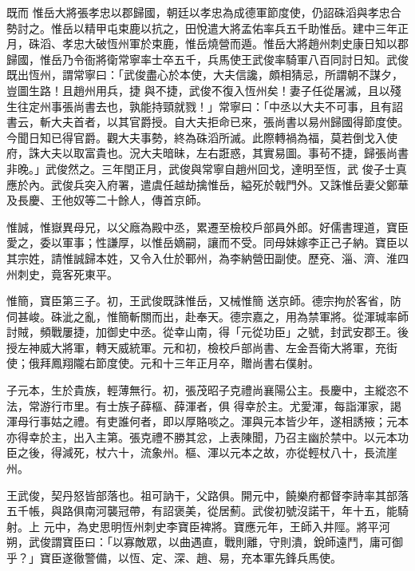 \begin{pinyinscope}
 既而
 惟岳大將張孝忠以郡歸國，朝廷以孝忠為成德軍節度使，仍詔硃滔與孝忠合勢討之。惟岳以精甲屯束鹿以抗之，田悅遣大將孟佑率兵五千助惟岳。建中三年正月，硃滔、孝忠大破恆州軍於束鹿，惟岳燒營而遁。惟岳大將趙州刺史康日知以郡歸國，惟岳乃令衙將衛常寧率士卒五千，兵馬使王武俊率騎軍八百同討日知。武俊既出恆州，謂常寧曰：「武俊盡心於本使，大夫信讒，頗相猜忌，所謂朝不謀夕，豈圖生路！且趙州用兵，捷
 與不捷，武俊不復入恆州矣！妻子任從屠滅，且以殘生往定州事張尚書去也，孰能持頸就戮！」常寧曰：「中丞以大夫不可事，且有詔書云，斬大夫首者，以其官爵授。自大夫拒命已來，張尚書以易州歸國得節度使。今聞日知已得官爵。觀大夫事勢，終為硃滔所滅。此際轉禍為福，莫若倒戈入使府，誅大夫以取富貴也。況大夫暗昧，左右誑惑，其實易圖。事茍不捷，歸張尚書非晚。」武俊然之。三年閏正月，武俊與常寧自趙州回戈，達明至恆，武
 俊子士真應於內。武俊兵突入府署，遣虞任越劫擒惟岳，縊死於戟門外。又誅惟岳妻父鄭華及長慶、王他奴等二十餘人，傳首京師。



 惟誠，惟嶽異母兄，以父廕為殿中丞，累遷至檢校戶部員外郎。好儒書理道，寶臣愛之，委以軍事；性謙厚，以惟岳嫡嗣，讓而不受。同母妹嫁李正己子納。寶臣以其宗姓，請惟誠歸本姓，又令入仕於鄆州，為李納營田副使。歷兗、淄、濟、淮四州刺史，竟客死東平。



 惟簡，寶臣第三子。初，王武俊既誅惟岳，又械惟簡
 送京師。德宗拘於客省，防伺甚峻。硃泚之亂，惟簡斬關而出，赴奉天。德宗嘉之，用為禁軍將。從渾瑊率師討賊，頻戰屢捷，加御史中丞。從幸山南，得「元從功臣」之號，封武安郡王。後授左神威大將軍，轉天威統軍。元和初，檢校戶部尚書、左金吾衛大將軍，充街使；俄拜鳳翔隴右節度使。元和十三年正月卒，贈尚書右僕射。



 子元本，生於貴族，輕薄無行。初，張茂昭子克禮尚襄陽公主。長慶中，主縱恣不法，常游行市里。有士族子薛樞、薛渾者，俱
 得幸於主。尤愛渾，每詣渾家，謁渾母行事姑之禮。有吏誰何者，即以厚賂啖之。渾與元本皆少年，遂相誘掖；元本亦得幸於主，出入主第。張克禮不勝其忿，上表陳聞，乃召主幽於禁中。以元本功臣之後，得減死，杖六十，流象州。樞、渾以元本之故，亦從輕杖八十，長流崖州。



 王武俊，契丹怒皆部落也。祖可訥干，父路俱。開元中，饒樂府都督李詩率其部落五千帳，與路俱南河襲冠帶，有詔褒美，從居薊。武俊初號沒諾干，年十五，能騎射。上
 元中，為史思明恆州刺史李寶臣裨將。寶應元年，王師入井陘。將平河朔，武俊謂寶臣曰：「以寡敵眾，以曲遇直，戰則離，守則潰，銳師遠鬥，庸可御乎？」寶臣遂徹警備，以恆、定、深、趙、易，充本軍先鋒兵馬使。




\end{pinyinscope}

